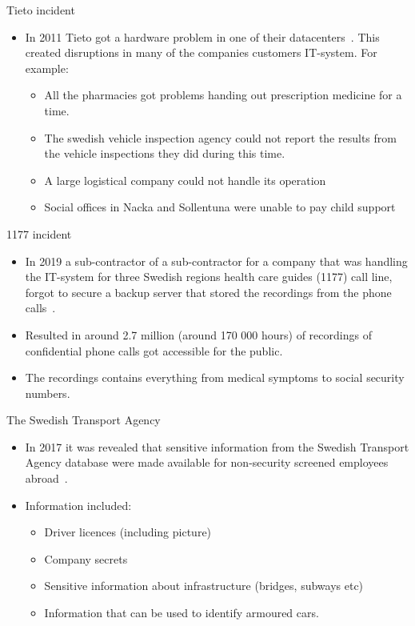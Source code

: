 \documentclass{beamer}
\begin{document}
\begin{frame}{Tieto incident}
  \begin{itemize}
    \item In 2011 Tieto got a hardware problem in one of their
      datacenters~\cite{Lindkvist2012tdf}. This created disruptions in many of
      the companies customers IT-system. For example: 
      \begin{itemize}
        \item All the pharmacies got problems handing out prescription medicine for a
          time.
        \item The swedish vehicle inspection agency could not report the results
          from the vehicle inspections they did during this time.
        \item A large logistical company could not handle its operation
        \item Social offices in Nacka and Sollentuna were unable to pay child
          support
      \end{itemize}
  \end{itemize}
\end{frame}
\begin{frame}{1177 incident}
  \begin{itemize}
    \item In 2019 a sub-contractor of a sub-contractor for a company that was
      handling the IT-system for three Swedish regions health care guides (1177)
      call line, forgot to secure a backup server that stored the recordings
      from the phone calls~\cite{Ottsjo2019}.
    \item Resulted in around 2.7 million (around 170 000 hours) of recordings of
      confidential phone calls got accessible for the public.
    \item The recordings contains everything from medical symptoms to social
      security numbers.
  \end{itemize}
\end{frame}
\begin{frame}{The Swedish Transport Agency}
  \begin{itemize}
    \item In 2017 it was revealed that sensitive information from the Swedish
      Transport Agency database were made available for non-security screened
      employees abroad~\cite{SvTTransport2017}. 
    \item Information included:
      \begin{itemize}
        \item Driver licences (including picture)
        \item Company secrets
        \item Sensitive information about infrastructure (bridges, subways etc)
        \item Information that can be used to identify armoured cars.
      \end{itemize}
  \end{itemize}
\end{frame}
\end{document}
